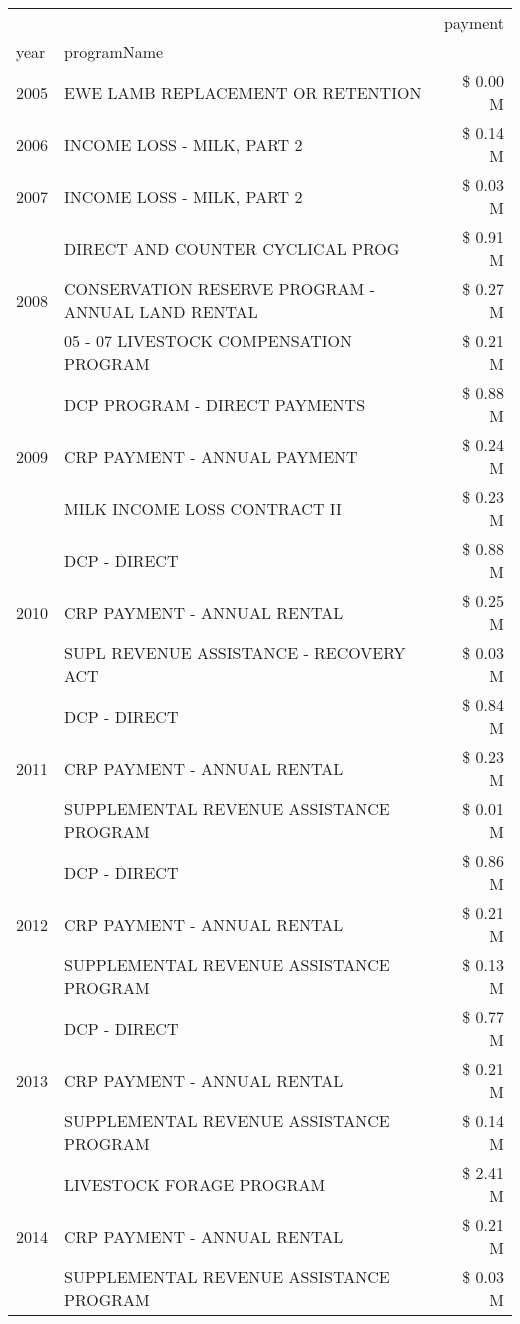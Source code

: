 \begin{tabular}{llr}
\toprule
 &  & payment \\
year & programName &  \\
\midrule
2005 & EWE LAMB REPLACEMENT OR RETENTION & \$ 0.00 M \\
\cline{1-3}
2006 & INCOME LOSS - MILK, PART 2 & \$ 0.14 M \\
\cline{1-3}
2007 & INCOME LOSS - MILK, PART 2 & \$ 0.03 M \\
\cline{1-3}
\multirow[t]{3}{*}{2008} & DIRECT AND COUNTER CYCLICAL PROG & \$ 0.91 M \\
 & CONSERVATION RESERVE PROGRAM - ANNUAL LAND RENTAL & \$ 0.27 M \\
 & 05 - 07 LIVESTOCK COMPENSATION PROGRAM & \$ 0.21 M \\
\cline{1-3}
\multirow[t]{3}{*}{2009} & DCP PROGRAM - DIRECT PAYMENTS & \$ 0.88 M \\
 & CRP PAYMENT - ANNUAL PAYMENT & \$ 0.24 M \\
 & MILK INCOME LOSS CONTRACT II & \$ 0.23 M \\
\cline{1-3}
\multirow[t]{3}{*}{2010} & DCP - DIRECT & \$ 0.88 M \\
 & CRP PAYMENT - ANNUAL RENTAL & \$ 0.25 M \\
 & SUPL REVENUE ASSISTANCE - RECOVERY ACT & \$ 0.03 M \\
\cline{1-3}
\multirow[t]{3}{*}{2011} & DCP - DIRECT & \$ 0.84 M \\
 & CRP PAYMENT - ANNUAL RENTAL & \$ 0.23 M \\
 & SUPPLEMENTAL REVENUE ASSISTANCE PROGRAM & \$ 0.01 M \\
\cline{1-3}
\multirow[t]{3}{*}{2012} & DCP - DIRECT & \$ 0.86 M \\
 & CRP PAYMENT - ANNUAL RENTAL & \$ 0.21 M \\
 & SUPPLEMENTAL REVENUE ASSISTANCE PROGRAM & \$ 0.13 M \\
\cline{1-3}
\multirow[t]{3}{*}{2013} & DCP - DIRECT & \$ 0.77 M \\
 & CRP PAYMENT - ANNUAL RENTAL & \$ 0.21 M \\
 & SUPPLEMENTAL REVENUE ASSISTANCE PROGRAM & \$ 0.14 M \\
\cline{1-3}
\multirow[t]{3}{*}{2014} & LIVESTOCK FORAGE PROGRAM & \$ 2.41 M \\
 & CRP PAYMENT - ANNUAL RENTAL & \$ 0.21 M \\
 & SUPPLEMENTAL REVENUE ASSISTANCE PROGRAM & \$ 0.03 M \\
\cline{1-3}

\end{tabular}
